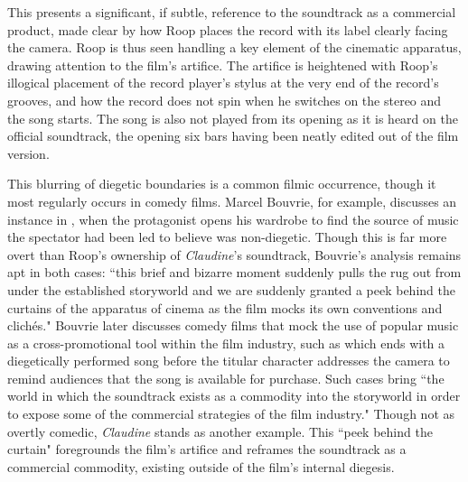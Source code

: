 This presents a significant, if subtle, reference to the soundtrack as a commercial product, made clear by how Roop places the record with its label clearly facing the camera.
Roop is thus seen handling a key element of the cinematic apparatus, drawing attention to the film's artifice.
The artifice is heightened with Roop's illogical placement of the record player's stylus at the very end of the record's grooves, and how the record does not spin when he switches on the stereo and the song starts.
The song is also not played from its opening as it is heard on the official soundtrack, the opening six bars having been neatly edited out of the film version.

This blurring of diegetic boundaries is a common filmic occurrence, though it most regularly occurs in comedy films.
Marcel Bouvrie, for example, discusses an instance in \textcite{allen_bananas_1971}, when the protagonist opens his wardrobe to find the source of music the spectator had been led to believe was non-diegetic.
Though this is far more overt than Roop's ownership of \textit{Claudine}'s soundtrack, Bouvrie's analysis remains apt in both cases: ``this brief and bizarre moment suddenly pulls the rug out from under the established storyworld and we are suddenly granted a peek behind the curtains of the apparatus of cinema as the film mocks its own conventions and clichés."\autocite[][103]{bouvrie_self-aware_2023}
Bouvrie later discusses comedy films that mock the use of popular music as a cross-promotional tool within the film industry, such as \textcite{jones_monty_1979} which ends with a diegetically performed song before the titular character addresses the camera to remind audiences that the song is available for purchase.
Such cases bring ``the world in which the soundtrack exists as a commodity into the storyworld in order to expose some of the commercial strategies of the film industry."\autocite[][115]{bouvrie_self-aware_2023}
Though not as overtly comedic, \textit{Claudine} stands as another example.
This ``peek behind the curtain" foregrounds the film's artifice and reframes the soundtrack as a commercial commodity, existing outside of the film's internal diegesis.


